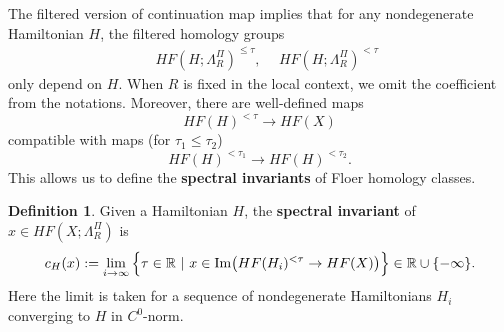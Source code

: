 \documentclass[reqno, 10pt]{amsart}
\numberwithin{equation}{section}
\numberwithin{equation}{section}
\theoremstyle{definition}
\newtheorem{defn}[thm]{Definition}
\theoremstyle{remark}
\newcommand{\beqn}{\begin{equation*}}
\newcommand{\eeqn}{\end{equation*}}
\newcommand{\mb}{\mathbb}
\begin{document}
The filtered version of continuation map implies that for any nondegenerate Hamiltonian $H$, the filtered homology groups
\begin{align*}
&\ HF (H; \Lambda_R^\Pi)^{\leq \tau},\ &\ HF (H; \Lambda_R^\Pi)^{<\tau}
\end{align*}
only depend on $H$. When $R$ is fixed in the local context, we omit the coefficient from the notations. Moreover, there are well-defined maps
\beqn
HF(H)^{<\tau} \to HF(X)
\eeqn
compatible with maps (for $\tau_1 \leq \tau_2$)
\beqn
HF(H)^{<\tau_1} \to HF(H)^{<\tau_2}.
\eeqn
This allows us to define the {\bf spectral invariants} of Floer homology classes.

\begin{defn}
Given a Hamiltonian $H$, the {\bf spectral invariant} of $x \in HF(X; \Lambda_R^\Pi)$ is 
\beqn
c_H(x):= \lim_{i \to \infty} \Big\{ \tau\in {\mb R}\ |\ x \in {\rm Im} \big( HF(H_i)^{<\tau} \to HF (X) \big) \Big\} \in {\mb R} \cup \{-\infty\}.
\eeqn
Here the limit is taken for a sequence of nondegenerate Hamiltonians $H_i$ converging to $H$ in $C^0$-norm.
\end{defn}
\end{document}
